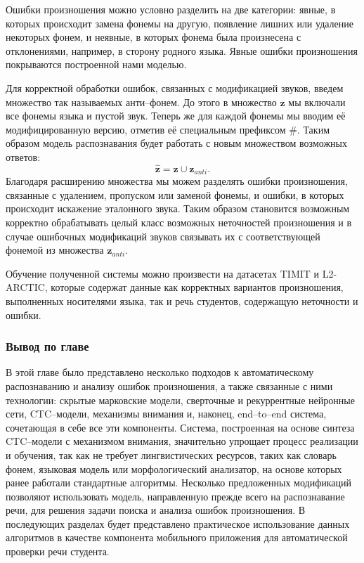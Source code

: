 Ошибки произношения можно условно разделить на две категории: явные, в которых происходит замена фонемы на другую, появление лишних или удаление некоторых фонем, и неявные, в которых фонема была произнесена с отклонениями, например, в сторону родного языка. Явные ошибки произношения покрываются построенной нами моделью. 

Для корректной обработки ошибок, связанных с модификацией звуков, введем множество так называемых анти--фонем\cite{yan2020end}. До этого в множество $\mathbf{z}$ мы включали все фонемы языка и пустой звук. Теперь же для каждой фонемы мы вводим её модифицированную версию, отметив её специальным префиксом \#. Таким образом модель распознавания будет работать с новым множеством возможных ответов:
$$\hat{\mathbf{z}} = \mathbf{z} \cup \mathbf{z}_{anti}.$$
Благодаря расширению множества мы можем разделять ошибки произношения, связанные с удалением, пропуском или заменой фонемы, и ошибки, в которых происходит искажение эталонного звука. Таким образом становится возможным корректно обрабатывать целый класс возможных неточностей произношения и в случае ошибочных модификаций звуков связывать их с соответствующей фонемой из множества $\mathbf{z}_{anti}$.

Обучение полученной системы можно произвести на датасетах TIMIT\cite{garofolo1993darpa} и L2-ARCTIC\cite{zhao2018l2}, которые содержат данные как корректных вариантов произношения, выполненных носителями языка, так и речь студентов, содержащую неточности и ошибки.

\subsubsection{Вывод по главе}
В этой главе было представлено несколько подходов к автоматическому распознаванию и анализу ошибок произношения, а также связанные с ними технологии: скрытые марковские модели, сверточные и рекуррентные нейронные сети, CTC--модели, механизмы внимания и, наконец, end--to--end система, сочетающая в себе все эти компоненты. Система, построенная на основе синтеза CTC--модели с механизмом внимания, значительно упрощает процесс реализации и обучения, так как не требует лингвистических ресурсов, таких как словарь фонем, языковая модель или морфологический анализатор, на основе которых ранее работали стандартные алгоритмы. Несколько предложенных модификаций позволяют использовать модель, направленную прежде всего на распознавание речи, для решения задачи поиска и анализа ошибок произношения. В последующих разделах будет представлено практическое использование данных алгоритмов в качестве компонента мобильного приложения для автоматической проверки речи студента.
